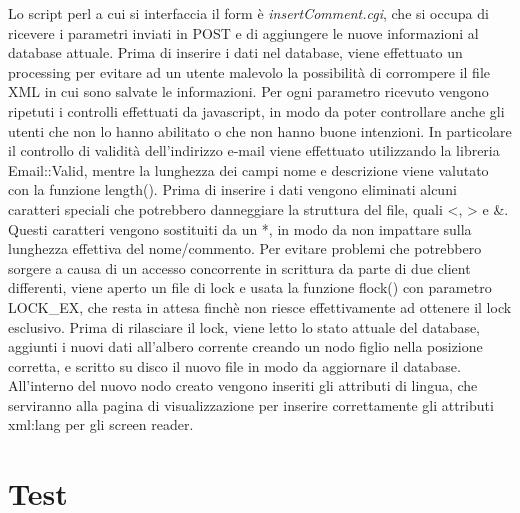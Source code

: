 \documentclass[10pt,a4paper,onecolumn]{article}
\begin{document}
Lo script perl a cui si interfaccia il form è \textit{insertComment.cgi}, che si occupa di ricevere i parametri inviati in POST e di aggiungere le nuove informazioni al database attuale.
Prima di inserire i dati nel database, viene effettuato un processing per evitare ad un utente malevolo la possibilità di corrompere il file XML in cui sono salvate le informazioni.
Per ogni parametro ricevuto vengono ripetuti i controlli effettuati da javascript, in modo da poter controllare anche gli utenti che non lo hanno abilitato o che non hanno buone intenzioni. In particolare il controllo di validità dell’indirizzo e-mail viene effettuato utilizzando la libreria Email::Valid, mentre la lunghezza dei campi nome e descrizione viene valutato con la funzione length().
Prima di inserire i dati vengono eliminati alcuni caratteri speciali che potrebbero danneggiare la struttura del file, quali <, > e \&. Questi caratteri vengono sostituiti da un *, in modo da non impattare sulla lunghezza effettiva del nome/commento.
Per evitare problemi che potrebbero sorgere a causa di un accesso concorrente in scrittura da parte di due client differenti, viene aperto un file di lock e usata la funzione flock() con parametro LOCK\_EX, che resta in attesa finchè non riesce effettivamente ad ottenere il lock esclusivo.
Prima di rilasciare il lock, viene letto lo stato attuale del database, aggiunti i nuovi dati all'albero corrente creando un nodo figlio nella posizione corretta, e scritto su disco il nuovo file in modo da aggiornare il database. All’interno del nuovo nodo creato vengono inseriti gli attributi di lingua, che serviranno alla pagina di visualizzazione per inserire correttamente gli attributi xml:lang per gli screen reader.

\clearpage

\section{Test}
\end{document}
